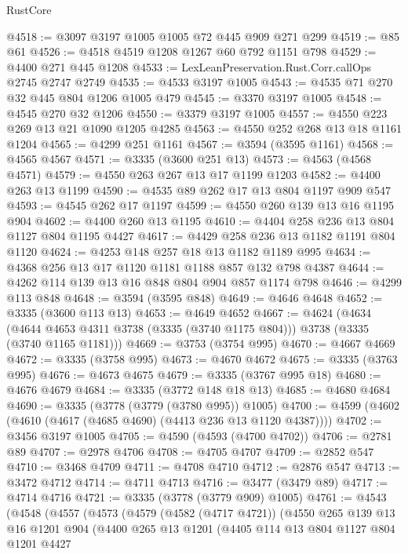 \begin{lexlean}{RustCore}
\begin{coremodule}
@4518 := @3097 @3197 @1005 @1005 @72 @445 @909 @271 @299
@4519 := @85 @61
@4526 := @4518 @4519 @1208 @1267 @60 @792 @1151 @798
@4529 := @4400 @271 @445 @1208
@4533 := LexLeanPreservation.Rust.Corr.callOps @2745 @2747 @2749
@4535 := @4533 @3197 @1005
@4543 := @4535 @71 @270 @32 @445 @804 @1206 @1005 @479
@4545 := @3370 @3197 @1005
@4548 := @4545 @270 @32 @1206
@4550 := @3379 @3197 @1005
@4557 := @4550 @223 @269 @13 @21 @1090 @1205 @4285
@4563 := @4550 @252 @268 @13 @18 @1161 @1204
@4565 := @4299 @251 @1161
@4567 := @3594 (@3595 @1161)
@4568 := @4565 @4567
@4571 := @3335 (@3600 @251 @13)
@4573 := @4563 (@4568 @4571)
@4579 := @4550 @263 @267 @13 @17 @1199 @1203
@4582 := @4400 @263 @13 @1199
@4590 := @4535 @89 @262 @17 @13 @804 @1197 @909 @547
@4593 := @4545 @262 @17 @1197
@4599 := @4550 @260 @139 @13 @16 @1195 @904
@4602 := @4400 @260 @13 @1195
@4610 := @4404 @258 @236 @13 @804 @1127 @804 @1195 @4427
@4617 := @4429 @258 @236 @13 @1182 @1191 @804 @1120
@4624 := @4253 @148 @257 @18 @13 @1182 @1189 @995
@4634 := @4368 @256 @13 @17 @1120 @1181 @1188 @857 @132 @798 @4387
@4644 := @4262 @114 @139 @13 @16 @848 @804 @904 @857 @1174 @798
@4646 := @4299 @113 @848
@4648 := @3594 (@3595 @848)
@4649 := @4646 @4648
@4652 := @3335 (@3600 @113 @13)
@4653 := @4649 @4652
@4667 := @4624
    (@4634 (@4644 @4653 @4311 @3738 (@3335 (@3740 @1175 @804))) @3738 (@3335 (@3740 @1165 @1181)))
@4669 := @3753 (@3754 @995)
@4670 := @4667 @4669
@4672 := @3335 (@3758 @995)
@4673 := @4670 @4672
@4675 := @3335 (@3763 @995)
@4676 := @4673 @4675
@4679 := @3335 (@3767 @995 @18)
@4680 := @4676 @4679
@4684 := @3335 (@3772 @148 @18 @13)
@4685 := @4680 @4684
@4690 := @3335 (@3778 (@3779 (@3780 @995)) @1005)
@4700 := @4599 (@4602 (@4610 (@4617 (@4685 @4690) (@4413 @236 @13 @1120 @4387))))
@4702 := @3456 @3197 @1005
@4705 := @4590 (@4593 (@4700 @4702))
@4706 := @2781 @89
@4707 := @2978 @4706
@4708 := @4705 @4707
@4709 := @2852 @547
@4710 := @3468 @4709
@4711 := @4708 @4710
@4712 := @2876 @547
@4713 := @3472 @4712
@4714 := @4711 @4713
@4716 := @3477 (@3479 @89)
@4717 := @4714 @4716
@4721 := @3335 (@3778 (@3779 @909) @1005)
@4761 := @4543
    (@4548
      (@4557
        (@4573
          (@4579
            (@4582 (@4717 @4721))
            (@4550
              @265
              @139
              @13
              @16
              @1201
              @904
              (@4400
                @265
                @13
                @1201
                (@4405
                  @114
                  @13
                  @804
                  @1127
                  @804
                  @1201
                  @4427

\end{coremodule}
\end{lexlean}
